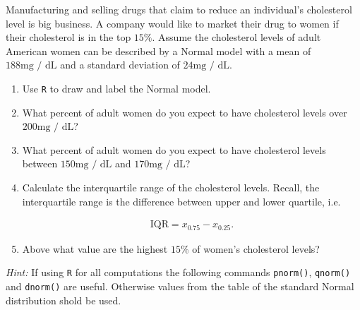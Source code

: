 
\begin{exercise}

Manufacturing and selling drugs that claim to reduce an individual's cholesterol level is big business.
A company would like to market their drug to women if their cholesterol is in the top $15 \%$.
Assume the cholesterol levels of adult American women can be described by a Normal model with a mean of $188 \text{mg / dL}$ and a standard deviation of $24 \text{mg / dL}$.

\begin{enumerate}[label = (\alph*)]

    \item Use \texttt R to draw and label the Normal model.
    
    \item What percent of adult women do you expect to have cholesterol levels over $200 \text{mg / dL}$?
    
    \item What percent of adult women do you expect to have cholesterol levels between $150 \text{mg / dL}$ and $170 \text{mg / dL}$?
    
    \item Calculate the interquartile range of the cholesterol levels.
    Recall, the interquartile range is the difference between upper and lower quartile, i.e.

    \begin{align*}
        \mathrm{IQR} = x_{0.75} - x_{0.25}.
    \end{align*}

    \item Above what value are the highest $15 \%$ of women's cholesterol levels?

\end{enumerate}

\textit{Hint:}
If using \texttt R for all computations the following commands \texttt{pnorm()}, \texttt{qnorm()} and \texttt{dnorm()} are useful.
Otherwise values from the table of the standard Normal distribution shold be used.

\end{exercise}


